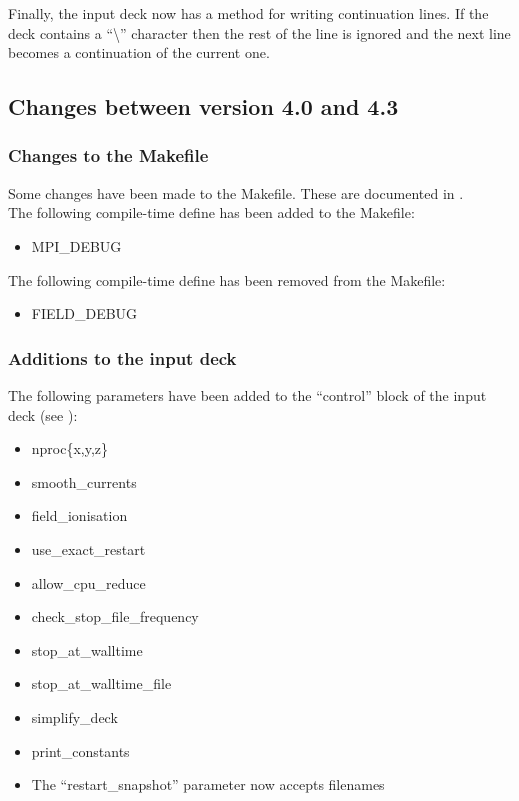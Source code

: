 Finally, the input deck now has a method for writing continuation lines.
If the deck contains a ``\textbackslash'' character then the rest of the line
is ignored and the next line becomes a continuation of the current one.


\subsection{Changes between version 4.0 and 4.3}

\subsubsection{Changes to the Makefile}

Some changes have been made to the Makefile. These are documented in
.\\

\noindent The following compile-time define has been added to the Makefile:
\begin{itemize}
\item MPI\_DEBUG
\end{itemize}
\bigskip

\noindent The following compile-time define has been removed from the Makefile:
\begin{itemize}
\item FIELD\_DEBUG
\end{itemize}


\subsubsection{Additions to the input deck}
The following parameters have been added to the ``control'' block of
the input deck (see ):
\begin{itemize}
\item nproc\{x,y,z\}
\item smooth\_currents
\item field\_ionisation
\item use\_exact\_restart
\item allow\_cpu\_reduce
\item check\_stop\_file\_frequency
\item stop\_at\_walltime
\item stop\_at\_walltime\_file
\item simplify\_deck
\item print\_constants
\item The ``restart\_snapshot'' parameter now accepts filenames
\end{itemize}
\bigskip

